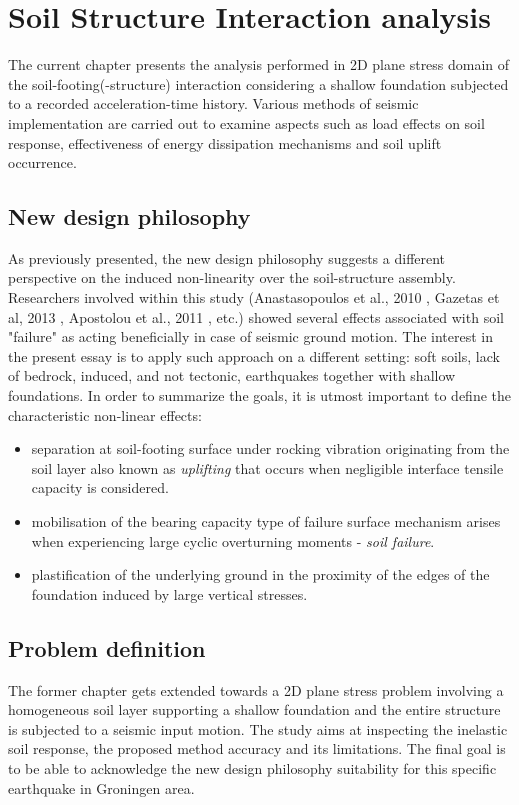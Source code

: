 	\chapter{Soil Structure Interaction analysis} \label{ch6}
	
	The current chapter presents the analysis performed in 2D plane stress domain of the soil-footing(-structure) interaction considering a shallow foundation subjected to a recorded acceleration-time history. Various methods of seismic implementation are carried out to examine aspects such as load effects on soil response, effectiveness of energy dissipation mechanisms and soil uplift occurrence.
	
	\section{New design philosophy}
	As previously presented, the new design philosophy suggests a different perspective on the induced non-linearity over the soil-structure assembly. Researchers involved within this study (Anastasopoulos et al., 2010 \cite{anastasopoulos2010soil}, Gazetas et al, 2013 \cite{gazetas2013nonlinear}, Apostolou et al., 2011 \cite{apostolou2011soil}, etc.) showed \mbox{several} effects associated with soil "failure" as acting beneficially in case of seismic ground motion. The interest in the present essay is to apply such approach on a different setting: soft soils, lack of bedrock, induced, and not tectonic, earthquakes together with shallow foundations. In order to summarize the goals, it is utmost important to define the characteristic non-linear effects:
	\begin{itemize}
		\item separation at soil-footing surface under rocking vibration originating from the soil layer also known as \textit{uplifting} that occurs when negligible interface tensile capacity is considered.
		\item mobilisation of the bearing capacity type of failure surface mechanism arises when experiencing large cyclic overturning moments - \textit{soil failure}.
		\item plastification of the underlying ground in the proximity of the edges of the foundation \mbox{induced} by large vertical stresses.
	\end{itemize} 
	
	\section{Problem definition}
	The former chapter gets extended towards a 2D plane stress problem involving a homogeneous soil layer supporting a shallow foundation and the entire structure is subjected to a seismic input motion. The study aims at inspecting the inelastic soil response, the proposed method accuracy and its limitations. The final goal is to be able to acknowledge the new design philosophy suitability for this specific earthquake in Groningen area.
	
